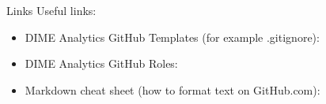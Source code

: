 \begin{frame}{Links}
	Useful links:	
	\begin{itemize}
		\item DIME Analytics GitHub Templates (for example .gitignore): 
		\item DIME Analytics GitHub Roles: 
		\item Markdown cheat sheet (how to format text on GitHub.com):  
	\end{itemize}
\end{frame}


